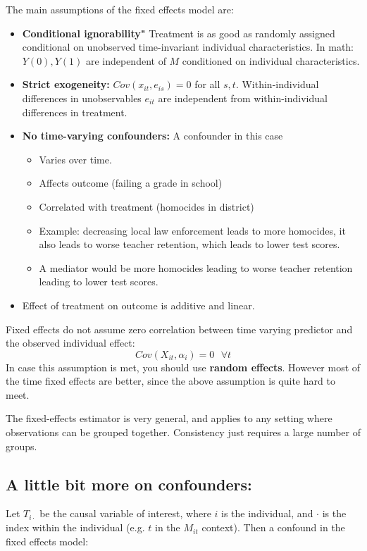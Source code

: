 \documentclass[12 pt, leqno]{article}
\begin{document}
The main assumptions of the fixed effects model are:
\begin{itemize}
\item \textbf{Conditional ignorability"} Treatment is as good as randomly assigned conditional on unobserved time-invariant individual characteristics. In math: $Y(0), Y(1)$ are independent of $M$ conditioned on individual characteristics. 
\item \textbf{Strict exogeneity:} $Cov(x_{it},e_{is}) = 0$ for all $s,t$. Within-individual differences in unobservables $e_{it}$ are independent from within-individual differences in treatment.
\item \textbf{No time-varying confounders:} A confounder in this case 
\begin{itemize}
\item Varies over time.
\item Affects outcome (failing a grade in school)
\item Correlated with treatment (homocides in district)
\item Example: decreasing local law enforcement leads to more homocides, it also leads to worse teacher retention, which leads to lower test scores.
\item A mediator would be more homocides leading to worse teacher retention leading to lower test scores.
\end{itemize}
\item  Effect of treatment on outcome is additive and linear. 
\end{itemize}

Fixed effects do not assume zero correlation between time varying predictor and the observed individual effect:
$$Cov(X_{it}, \alpha_i) = 0 \text{     } \forall t$$
In case this assumption is met, you should use \textbf{random effects}. However most of the time fixed effects are better, since the above assumption is quite hard to meet.

The fixed-effects estimator is very general, and applies to any setting where observations can be grouped together. Consistency just requires a large number of groups.

\subsection{A little bit more on confounders:}

Let $T_{i\cdot}$ be the causal variable of interest, where $i$ is the individual, and $\cdot$ is the index within the individual (e.g. $t$ in the $M_{it}$ context). Then a confound in the fixed effects model:
\end{document}

